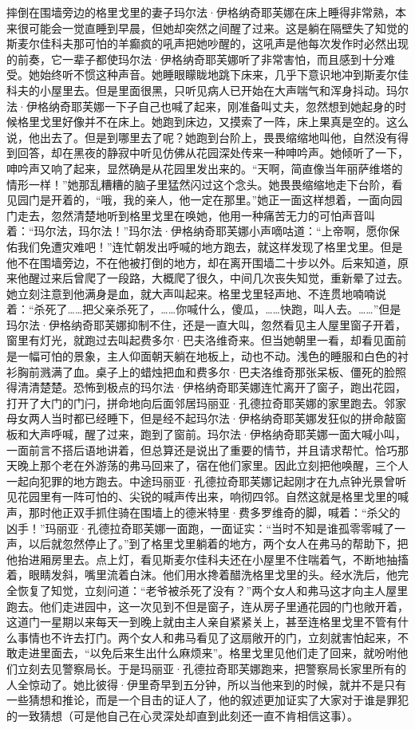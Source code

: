 \par 摔倒在围墙旁边的格里戈里的妻子玛尔法·伊格纳奇耶芙娜在床上睡得非常熟，本来很可能会一觉直睡到早晨，但她却突然之间醒了过来。这是躺在隔壁失了知觉的斯麦尔佳科夫那可怕的羊癫疯的吼声把她吵醒的，这吼声是他每次发作时必然出现的前奏，它一辈子都使玛尔法·伊格纳奇耶芙娜听了非常害怕，而且感到十分难受。她始终听不惯这种声音。她睡眼矇眬地跳下床来，几乎下意识地冲到斯麦尔佳科夫的小屋里去。但是里面很黑，只听见病人已开始在大声喘气和浑身抖动。玛尔法·伊格纳奇耶芙娜一下子自己也喊了起来，刚准备叫丈夫，忽然想到她起身的时候格里戈里好像并不在床上。她跑到床边，又摸索了一阵，床上果真是空的。这么说，他出去了。但是到哪里去了呢？她跑到台阶上，畏畏缩缩地叫他，自然没有得到回答，却在黑夜的静寂中听见仿佛从花园深处传来一种呻吟声。她倾听了一下，呻吟声又响了起来，显然确是从花园里发出来的。“天啊，简直像当年丽萨维塔的情形一样！”她那乱糟糟的脑子里猛然闪过这个念头。她畏畏缩缩地走下台阶，看见园门是开着的，“哦，我的亲人，他一定在那里。”她正一面这样想着，一面向园门走去，忽然清楚地听到格里戈里在唤她，他用一种痛苦无力的可怕声音叫着：“玛尔法，玛尔法！”玛尔法·伊格纳奇耶芙娜小声嘀咕道：“上帝啊，愿你保佑我们免遭灾难吧！”连忙朝发出呼喊的地方跑去，就这样发现了格里戈里。但是他不在围墙旁边，不在他被打倒的地方，却在离开围墙二十步以外。后来知道，原来他醒过来后曾爬了一段路，大概爬了很久，中间几次丧失知觉，重新晕了过去。她立刻注意到他满身是血，就大声叫起来。格里戈里轻声地、不连贯地喃喃说着：“杀死了……把父亲杀死了，……你喊什么，傻瓜，……快跑，叫人去。……”但是玛尔法·伊格纳奇耶芙娜抑制不住，还是一直大叫，忽然看见主人屋里窗子开着，窗里有灯光，就跑过去叫起费多尔·巴夫洛维奇来。但当她朝里一看，却看见面前是一幅可怕的景象，主人仰面朝天躺在地板上，动也不动。浅色的睡服和白色的衬衫胸前溅满了血。桌子上的蜡烛把血和费多尔·巴夫洛维奇那张呆板、僵死的脸照得清清楚楚。恐怖到极点的玛尔法·伊格纳奇耶芙娜连忙离开了窗子，跑出花园，打开了大门的门闩，拼命地向后面邻居玛丽亚·孔德拉奇耶芙娜的家里跑去。邻家母女两人当时都已经睡下，但是经不起玛尔法·伊格纳奇耶芙娜发狂似的拼命敲窗板和大声呼喊，醒了过来，跑到了窗前。玛尔法·伊格纳奇耶芙娜一面大喊小叫，一面前言不搭后语地讲着，但总算还是说出了重要的情节，并且请求帮忙。恰巧那天晚上那个老在外游荡的弗马回来了，宿在他们家里。因此立刻把他唤醒，三个人一起向犯罪的地方跑去。中途玛丽亚·孔德拉奇耶芙娜记起刚才在九点钟光景曾听见花园里有一阵可怕的、尖锐的喊声传出来，响彻四邻。自然这就是格里戈里的喊声，那时他正双手抓住骑在围墙上的德米特里·费多罗维奇的脚，喊着：“杀父的凶手！”玛丽亚·孔德拉奇耶芙娜一面跑，一面证实：“当时不知是谁孤零零喊了一声，以后就忽然停止了。”到了格里戈里躺着的地方，两个女人在弗马的帮助下，把他抬进厢房里去。点上灯，看见斯麦尔佳科夫还在小屋里不住喘着气，不断地抽搐着，眼睛发斜，嘴里流着白沫。他们用水搀着醋洗格里戈里的头。经水洗后，他完全恢复了知觉，立刻问道：“老爷被杀死了没有？”两个女人和弗马这才向主人屋里跑去。他们走进园中，这一次见到不但是窗子，连从房子里通花园的门也敞开着，这道门一星期以来每天一到晚上就由主人亲自紧紧关上，甚至连格里戈里不管有什么事情也不许去打门。两个女人和弗马看见了这扇敞开的门，立刻就害怕起来，不敢走进里面去，“以免后来生出什么麻烦来”。格里戈里见他们走了回来，就吩咐他们立刻去见警察局长。于是玛丽亚·孔德拉奇耶芙娜跑来，把警察局长家里所有的人全惊动了。她比彼得·伊里奇早到五分钟，所以当他来到的时候，就并不是只有一些猜想和推论，而是一个目击的证人了，他的叙述更加证实了大家对于谁是罪犯的一致猜想（可是他自己在心灵深处却直到此刻还一直不肯相信这事）。
